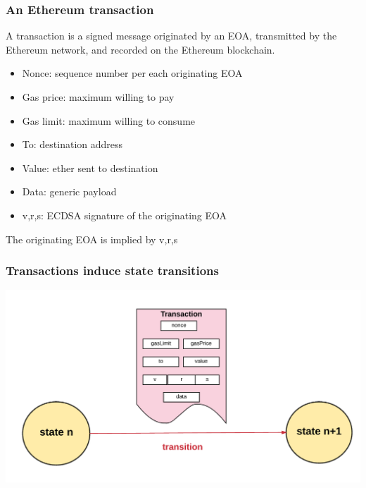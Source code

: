 \documentclass[11pt]{beamer}  %
\begin{document}
\begin{frame}\frametitle{An Ethereum transaction}

  \begin{greenbox}{}
    A transaction is a signed message originated by an EOA, transmitted
    by the Ethereum network, and recorded on the Ethereum blockchain.
    \begin{itemize}
    \item Nonce: sequence number per each originating EOA
    \item Gas price: maximum willing to pay
    \item Gas limit: maximum willing to consume
    \item To: destination address
    \item Value: ether sent to destination
    \item Data: generic payload
    \item v,r,s: ECDSA signature of the originating EOA
    \end{itemize}
  \end{greenbox}

  \begin{center}
    The originating EOA is implied by v,r,s
  \end{center}

\end{frame}

\begin{frame}\frametitle{Transactions induce state transitions}

  \begin{center}
    \includegraphics[width=\textwidth,clip=false]{pictures/state-transition.png}
  \end{center}

\end{frame}
\end{document}
